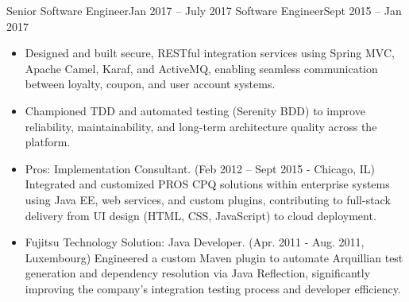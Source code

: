 \documentclass[10pt,a4paper,withhyper]{altacv}
\begin{document}
\begin{paracol}{2}
\divider

				{Senior Software Engineer}{Jan 2017 --  July 2017}
				{Software Engineer}{Sept 2015 --  Jan 2017}
\begin{itemize}		
\item Designed and built secure, RESTful integration services using Spring MVC, Apache Camel, Karaf, and ActiveMQ, enabling seamless communication between loyalty, coupon, and user account systems.
\item Championed TDD and automated testing (Serenity BDD) to improve reliability, maintainability, and long-term architecture quality across the platform.
\end{itemize}

\divider

\begin{itemize}
\item Pros: Implementation Consultant. (Feb 2012 -- Sept 2015 - Chicago, IL) Integrated and customized PROS CPQ solutions within enterprise systems using Java EE, web services, and custom plugins, contributing to full-stack delivery from UI design (HTML, CSS, JavaScript) to cloud deployment.
\item Fujitsu Technology Solution: Java Developer. (Apr. 2011 - Aug. 2011, Luxembourg) Engineered a custom Maven plugin to automate Arquillian test generation and dependency resolution via Java Reflection, significantly improving the company’s integration testing process and developer efficiency.
\end{itemize}








\end{paracol}
\end{document}
